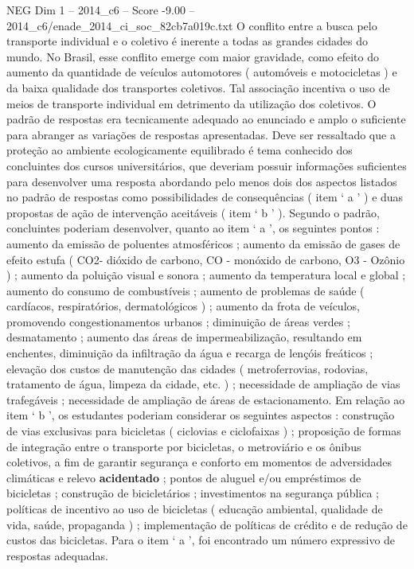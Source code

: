 \begin{textsample}{NEG Dim 1 – 2014\_c6 – Score -9.00 – 2014\_c6/enade\_2014\_ci\_soc\_82cb7a019c.txt}
O conflito entre a busca pelo transporte individual e o coletivo é inerente a todas as grandes cidades do mundo.
No Brasil, esse conflito emerge com maior gravidade, como efeito do aumento da quantidade de veículos automotores ( automóveis e motocicletas ) e da baixa qualidade dos transportes coletivos.
Tal associação incentiva o uso de meios de transporte individual em detrimento da utilização dos coletivos.
O padrão de respostas era tecnicamente adequado ao enunciado e amplo o suficiente para abranger as variações de respostas apresentadas.
Deve ser ressaltado que a proteção ao ambiente ecologicamente equilibrado é tema conhecido dos concluintes dos cursos universitários, que deveriam possuir informações suficientes para desenvolver uma resposta abordando pelo menos dois dos aspectos listados no padrão de respostas como possibilidades de consequências ( item ‘ a ’ ) e duas propostas de ação de intervenção aceitáveis ( item ‘ b ’ ).
Segundo o padrão, concluintes poderiam desenvolver, quanto ao item ‘ a ’, os seguintes pontos : aumento da emissão de poluentes atmosféricos ; aumento da emissão de gases de efeito estufa ( CO2- dióxido de carbono, CO - monóxido de carbono, O3 - Ozônio ) ; aumento da poluição visual e sonora ; aumento da temperatura local e global ; aumento do consumo de combustíveis ; aumento de problemas de saúde ( cardíacos, respiratórios, dermatológicos ) ; aumento da frota de veículos, promovendo congestionamentos urbanos ; diminuição de áreas verdes ; desmatamento ; aumento das áreas de impermeabilização, resultando em enchentes, diminuição da infiltração da água e recarga de lençóis freáticos ; elevação dos custos de manutenção das cidades ( metroferrovias, rodovias, tratamento de água, limpeza da cidade, etc. ) ; necessidade de ampliação de vias trafegáveis ; necessidade de ampliação de áreas de estacionamento.
Em relação ao item ‘ b ’, os estudantes poderiam considerar os seguintes aspectos : construção de vias exclusivas para bicicletas ( ciclovias e ciclofaixas ) ; proposição de formas de integração entre o transporte por bicicletas, o metroviário e os ônibus coletivos, a fim de garantir segurança e conforto em momentos de adversidades climáticas e relevo \textbf{acidentado} ; pontos de aluguel e/ou empréstimos de bicicletas ; construção de bicicletários ; investimentos na segurança pública ; políticas de incentivo ao uso de bicicletas ( educação ambiental, qualidade de vida, saúde, propaganda ) ; implementação de políticas de crédito e de redução de custos das bicicletas.
Para o item ‘ a ’, foi encontrado um número expressivo de respostas adequadas.

\end{textsample}
